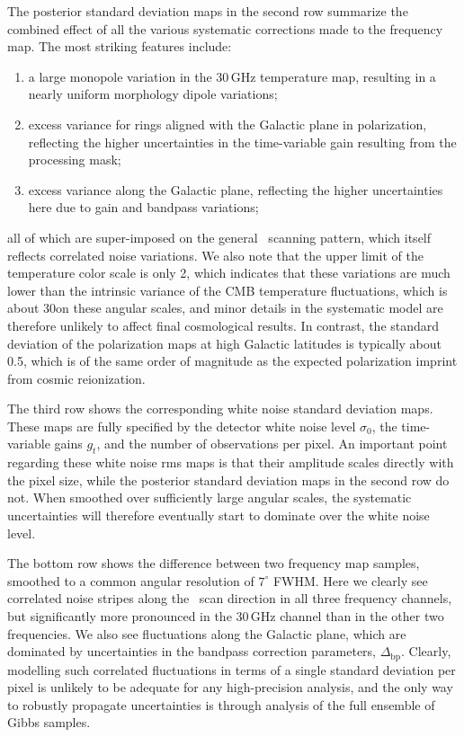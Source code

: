 \documentclass[twocolumn]{aa}
\begin{document}
The posterior standard deviation maps in the second row summarize the
combined effect of all the various systematic corrections made to the
frequency map. The most striking features include:
\begin{enumerate}
  \item a large monopole variation in the 30\,GHz temperature map,
    resulting in a nearly uniform morphology dipole variations;
  \item excess variance for rings aligned with the Galactic plane in
    polarization, reflecting the higher uncertainties in the
    time-variable gain resulting from the processing mask;
  \item excess variance along the Galactic plane, reflecting the
    higher uncertainties here due to gain and bandpass variations;
\end{enumerate}
all of which are super-imposed on the general \Planck\ scanning
pattern, which itself reflects correlated noise variations. We also
note that the upper limit of the temperature color scale is only
2\muK, which indicates that these variations are much lower than the
intrinsic variance of the CMB temperature fluctuations, which is about
30\muK on these angular scales, and minor details in the systematic
model are therefore unlikely to affect final cosmological results. In
contrast, the standard deviation of the polarization maps at high
Galactic latitudes is typically about 0.5\muK, which is of the same
order of magnitude as the expected polarization imprint from cosmic
reionization. 



The third row shows the corresponding white noise standard deviation
maps. These maps are fully specified by the detector white noise level
$\sigma_0$, the time-variable gains $g_t$, and the number of
observations per pixel. An important point regarding these white noise
rms maps is that their amplitude scales directly with the pixel size,
while the posterior standard deviation maps in the second row do
not. When smoothed over sufficiently large angular scales, the
systematic uncertainties will therefore eventually start to dominate
over the white noise level. 

The bottom row shows the difference between two frequency map samples,
smoothed to a common angular resolution of $7^{\circ}$ FWHM. Here we
clearly see correlated noise stripes along the \Planck\ scan direction
in all three frequency channels, but significantly more pronounced in
the 30\,GHz channel than in the other two frequencies. We also see
fluctuations along the Galactic plane, which are dominated by
uncertainties in the bandpass correction parameters,
$\Delta_{\mathrm{bp}}$. Clearly, modelling such correlated
fluctuations in terms of a single standard deviation per pixel is
unlikely to be adequate for any high-precision analysis, and the only
way to robustly propagate uncertainties is through analysis of the
full ensemble of Gibbs samples.
\end{document}
